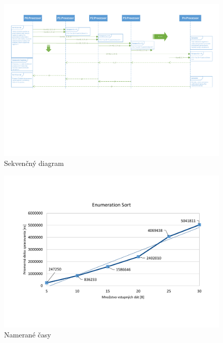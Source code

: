 \documentclass[a4paper,11pt]{article}
\begin{document}
\begin{figure}[!htb]
\centering
\includegraphics[width=\textwidth]{sequence.pdf}
\caption{Sekvenčný diagram}
\end{figure}

\begin{figure}[!htb]
\centering
\includegraphics[width=\textwidth]{stats.pdf}
\caption{Namerané časy}
\end{figure}
\end{document}
